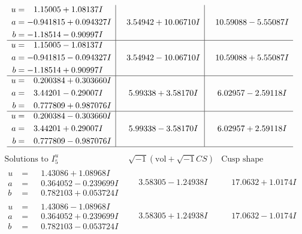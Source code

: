 \documentclass[1p]{elsarticle_modified}
\theoremstyle{definition}
\newcommand{\I}{\sqrt{-1}}
\begin{document}
$$\begin{array}{c|c|c}
\begin{aligned}
u &= \phantom{-}1.15005 + 1.08137 I \\
a &= -0.941815 + 0.094327 I \\
b &= -1.18514 - 0.90997 I\end{aligned}
 & \phantom{-}3.54942 + 10.06710 I & \phantom{-}10.59088 - 5.55087 I \\ \hline\begin{aligned}
u &= \phantom{-}1.15005 - 1.08137 I \\
a &= -0.941815 - 0.094327 I \\
b &= -1.18514 + 0.90997 I\end{aligned}
 & \phantom{-}3.54942 - 10.06710 I & \phantom{-}10.59088 + 5.55087 I \\ \hline\begin{aligned}
u &= \phantom{-}0.200384 + 0.303660 I \\
a &= \phantom{-}3.44201 - 0.29007 I \\
b &= \phantom{-}0.777809 + 0.987076 I\end{aligned}
 & \phantom{-}5.99338 + 3.58170 I & \phantom{-}6.02957 - 2.59118 I \\ \hline\begin{aligned}
u &= \phantom{-}0.200384 - 0.303660 I \\
a &= \phantom{-}3.44201 + 0.29007 I \\
b &= \phantom{-}0.777809 - 0.987076 I\end{aligned}
 & \phantom{-}5.99338 - 3.58170 I & \phantom{-}6.02957 + 2.59118 I\\
 \hline 
 \end{array}$$\newpage$$\begin{array}{c|c|c}  
\text{Solutions to }I^u_{5}& \I (\text{vol} + \sqrt{-1}CS) & \text{Cusp shape}\\
 \hline 
\begin{aligned}
u &= \phantom{-}1.43086 + 1.08968 I \\
a &= \phantom{-}0.364052 - 0.239699 I \\
b &= \phantom{-}0.782103 + 0.053724 I\end{aligned}
 & \phantom{-}3.58305 - 1.24938 I & \phantom{-}17.0632 + 1.0174 I \\ \hline\begin{aligned}
u &= \phantom{-}1.43086 - 1.08968 I \\
a &= \phantom{-}0.364052 + 0.239699 I \\
b &= \phantom{-}0.782103 - 0.053724 I\end{aligned}
 & \phantom{-}3.58305 + 1.24938 I & \phantom{-}17.0632 - 1.0174 I \\ \hline\begin{aligned}

\end{aligned}
\end{array}$$
\end{document}
